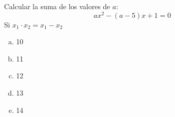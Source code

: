 \documentclass[12pt, a5paper]{article}
\begin{document}
Calcular la suma de los valores de $a$:
$$
ax^2 - (a - 5)x + 1 = 0
$$
Si $x_1 \cdot x_2 = x_1 - x_2$

\begin{enumerate}[a) ]
	\item{10}
	\item{11}
	\item{12}
	\item{13}
	\item{14} %
\end{enumerate}
\end{document}
